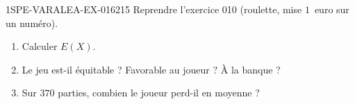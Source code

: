 \begin{exercice}{1SPE-VARALEA-EX-016}{2}{15}
Reprendre l'exercice 010 (roulette, mise $1$~euro sur un numéro).

\begin{enumerate}
  \item Calculer $E(X)$.
  \item Le jeu est-il équitable ? Favorable au joueur ? À la banque ?
  \item Sur $370$ parties, combien le joueur perd-il en moyenne ?
\end{enumerate}
\end{exercice}
